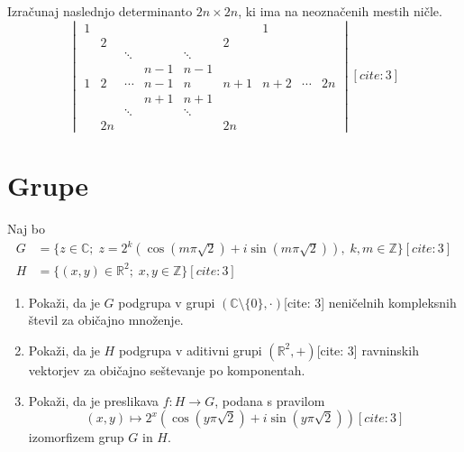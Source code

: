 \documentclass[a4paper,12pt]{article}
\begin{document}
Izračunaj naslednjo determinanto \(2n \times 2n\), ki ima na neoznačenih mestih ničle.
\[\begin{vmatrix} 1 & & & & & & 1 \\ & 2 & & & & 2 & \\ & & \ddots & & \ddots & & \\ & & & n-1 & n-1 & & \\ 1 & 2 & \cdots & n-1 & n & n+1 & n+2 & \cdots & 2n \\ & & & n+1 & n+1 & & \\ & & \ddots & & \ddots & & \\ & 2n & & & & 2n & \end{vmatrix}[cite: 3]\]
%
%

\section*{Grupe}

Naj bo
\begin{align*}
G &= \{z \in \mathbb{C}; \; z = 2^k(\cos(m\pi\sqrt{2}) + i\sin(m\pi\sqrt{2})), \; k, m \in \mathbb{Z}\}[cite: 3] \\
H &= \{(x, y) \in \mathbb{R}^2; \; x, y \in \mathbb{Z}\}[cite: 3]
\end{align*}
\begin{enumerate}
\item
Pokaži, da je \(G\) podgrupa v grupi \((\mathbb{C} \setminus \{0\}, \cdot)\)[cite: 3]
neničelnih kompleksnih števil za običajno množenje.

\item
Pokaži, da je \(H\) podgrupa v aditivni grupi \((\mathbb{R}^2, +)\)[cite: 3]
ravninskih vektorjev za običajno seštevanje po komponentah.

\item
Pokaži, da je preslikava \(f:H\to G\), podana s pravilom
\[(x, y) \mapsto 2^x(\cos(y\pi\sqrt{2}) + i\sin(y\pi\sqrt{2}))[cite: 3]\]
izomorfizem grup \(G\) in \(H\).
\end{enumerate}
\end{document}
